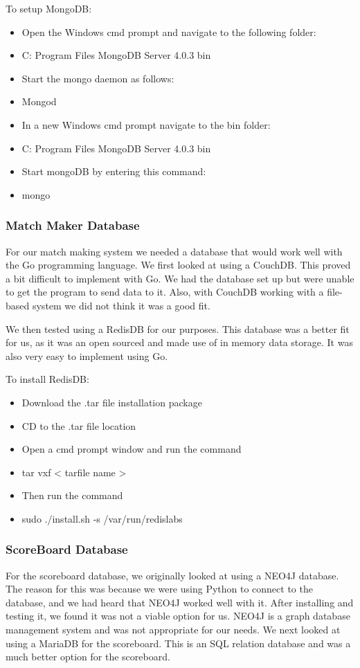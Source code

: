 To setup MongoDB:
\begin{itemize}
\item Open the Windows cmd prompt and navigate to the following folder:
\item C: Program Files MongoDB Server 4.0.3 bin 
\item Start the mongo daemon as follows:
\item Mongod
\item In a new Windows cmd prompt  navigate to the bin folder:
\item C: Program Files MongoDB Server 4.0.3 bin
\item Start mongoDB by entering this command:
\item	mongo
\end{itemize}
\newline
\subsubsection{Match Maker Database}
For our match making system we needed a database that would work well with the Go programming language. We first looked at using a CouchDB. This proved a bit difficult to implement with Go. We had the database set up but were unable to get the program to send data to it. Also, with CouchDB working with a file-based system we did not think it was a good fit.
\newline

We then tested using a RedisDB for our purposes. This database was a better fit for us, as it was an open sourced and made use of in memory data storage. It was also very easy to implement using Go.
\newline

To install RedisDB:
\begin{itemize}
\item Download the .tar file installation package
\item CD to the .tar file location 
\item Open a cmd prompt window and run the command
\item  tar vxf < tarfile name >
\item Then run the command 
\item sudo ./install.sh -s /var/run/redislabs
\end{itemize}
\newline
\subsubsection{ScoreBoard Database}
For the scoreboard database, we originally looked at using a NEO4J database.
The reason for this was because we were using Python to connect to the database, and we had heard that NEO4J worked well with it. After installing and testing it, we found it was not a viable option for us. NEO4J is a graph database management system and was not appropriate for our needs.
We next looked at using a MariaDB for the scoreboard. This is an SQL relation database and was a much better option for the scoreboard.
\newline

